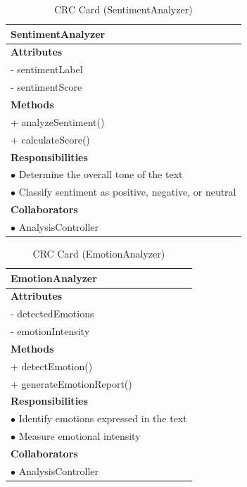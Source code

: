 \documentclass[12pt,a4paper]{report}
\begin{document}
\begin{table}[H]
\centering
\caption{CRC Card (SentimentAnalyzer)}
\label{tab:crc_sentiment}
\begin{tabularx}{\textwidth}{|X|}
\hline
\textbf{SentimentAnalyzer} \\
\hline
\textbf{Attributes} \\
- sentimentLabel \\
- sentimentScore \\
\hline
\textbf{Methods} \\
+ analyzeSentiment() \\
+ calculateScore() \\
\hline
\textbf{Responsibilities} \\
$\bullet$ Determine the overall tone of the text \\
$\bullet$ Classify sentiment as positive, negative, or neutral \\
\hline
\textbf{Collaborators} \\
$\bullet$ AnalysisController \\
\hline
\end{tabularx}
\end{table}

\begin{table}[H]
\centering
\caption{CRC Card (EmotionAnalyzer)}
\label{tab:crc_emotion}
\begin{tabularx}{\textwidth}{|X|}
\hline
\textbf{EmotionAnalyzer} \\
\hline
\textbf{Attributes} \\
- detectedEmotions \\
- emotionIntensity \\
\hline
\textbf{Methods} \\
+ detectEmotion() \\
+ generateEmotionReport() \\
\hline
\textbf{Responsibilities} \\
$\bullet$ Identify emotions expressed in the text \\
$\bullet$ Measure emotional intensity \\
\hline
\textbf{Collaborators} \\
$\bullet$ AnalysisController \\
\hline
\end{tabularx}
\end{table}
\end{document}

